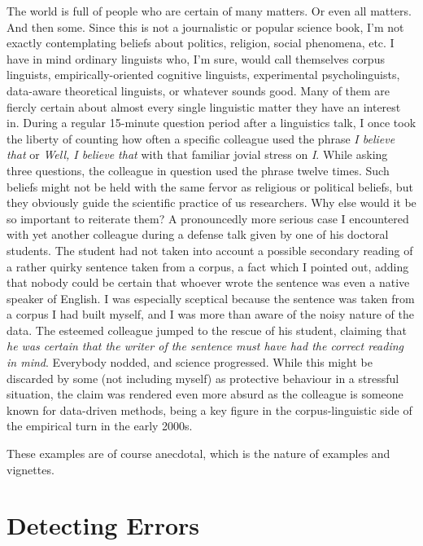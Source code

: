 The world is full of people who are certain of many matters.
Or even all matters.
And then some.
Since this is not a journalistic or popular science book, I'm not exactly contemplating beliefs about politics, religion, social phenomena, etc.
I have in mind ordinary linguists who, I'm sure, would call themselves corpus linguists, empirically-oriented cognitive linguists, experimental psycholinguists, data-aware theoretical linguists, or whatever sounds good.
Many of them are fiercly certain about almost every single linguistic matter they have an interest in.
During a regular 15-minute question period after a linguistics talk, I once took the liberty of counting how often a specific colleague used the phrase \textit{I believe that} or \textit{Well, I believe that} with that familiar jovial stress on \textit{I}.
While asking three questions, the colleague in question used the phrase twelve times.
Such beliefs might not be held with the same fervor as religious or political beliefs, but they obviously guide the scientific practice of us researchers.
Why else would it be so important to reiterate them?
A pronouncedly more serious case I encountered with yet another colleague during a defense talk given by one of his doctoral students.
The student had not taken into account a possible secondary reading of a rather quirky sentence taken from a corpus, a fact which I pointed out, adding that nobody could be certain that whoever wrote the sentence was even a native speaker of English.
I was especially sceptical because the sentence was taken from a corpus I had built myself, and I was more than aware of the noisy nature of the data.
The esteemed colleague jumped to the rescue of his student, claiming that \textit{he was certain that the writer of the sentence must have had the correct reading in mind}.
Everybody nodded, and science progressed.
While this might be discarded by some (not including myself) as protective behaviour in a stressful situation, the claim was rendered even more absurd as the colleague is someone known for data-driven methods, being a key figure in the corpus-linguistic side of the empirical turn in the early 2000s.

These examples are of course anecdotal, which is the nature of examples and vignettes.


\section{Detecting Errors}
\label{sec:detectingerrors}

